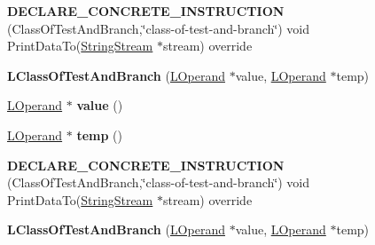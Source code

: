 \begin{DoxyCompactItemize}
\item 
{\bfseries D\+E\+C\+L\+A\+R\+E\+\_\+\+C\+O\+N\+C\+R\+E\+T\+E\+\_\+\+I\+N\+S\+T\+R\+U\+C\+T\+I\+ON} (Class\+Of\+Test\+And\+Branch,\char`\"{}class-\/of-\/test-\/and-\/branch\char`\"{}) void Print\+Data\+To(\hyperlink{classv8_1_1internal_1_1_string_stream}{String\+Stream} $\ast$stream) override\hypertarget{classv8_1_1internal_1_1_l_class_of_test_and_branch_a029c33ea762efee5c0e2f13b702a3b6f}{}\label{classv8_1_1internal_1_1_l_class_of_test_and_branch_a029c33ea762efee5c0e2f13b702a3b6f}

\item 
{\bfseries L\+Class\+Of\+Test\+And\+Branch} (\hyperlink{classv8_1_1internal_1_1_l_operand}{L\+Operand} $\ast$value, \hyperlink{classv8_1_1internal_1_1_l_operand}{L\+Operand} $\ast$temp)\hypertarget{classv8_1_1internal_1_1_l_class_of_test_and_branch_a39178393b36ba59838196357be36ab79}{}\label{classv8_1_1internal_1_1_l_class_of_test_and_branch_a39178393b36ba59838196357be36ab79}

\item 
\hyperlink{classv8_1_1internal_1_1_l_operand}{L\+Operand} $\ast$ {\bfseries value} ()\hypertarget{classv8_1_1internal_1_1_l_class_of_test_and_branch_a701d1d88a41fd46c94cc2d33ec5093b6}{}\label{classv8_1_1internal_1_1_l_class_of_test_and_branch_a701d1d88a41fd46c94cc2d33ec5093b6}

\item 
\hyperlink{classv8_1_1internal_1_1_l_operand}{L\+Operand} $\ast$ {\bfseries temp} ()\hypertarget{classv8_1_1internal_1_1_l_class_of_test_and_branch_ad6879400ca43794c61f3e6ac2829ddab}{}\label{classv8_1_1internal_1_1_l_class_of_test_and_branch_ad6879400ca43794c61f3e6ac2829ddab}

\item 
{\bfseries D\+E\+C\+L\+A\+R\+E\+\_\+\+C\+O\+N\+C\+R\+E\+T\+E\+\_\+\+I\+N\+S\+T\+R\+U\+C\+T\+I\+ON} (Class\+Of\+Test\+And\+Branch,\char`\"{}class-\/of-\/test-\/and-\/branch\char`\"{}) void Print\+Data\+To(\hyperlink{classv8_1_1internal_1_1_string_stream}{String\+Stream} $\ast$stream) override\hypertarget{classv8_1_1internal_1_1_l_class_of_test_and_branch_a029c33ea762efee5c0e2f13b702a3b6f}{}\label{classv8_1_1internal_1_1_l_class_of_test_and_branch_a029c33ea762efee5c0e2f13b702a3b6f}

\item 
{\bfseries L\+Class\+Of\+Test\+And\+Branch} (\hyperlink{classv8_1_1internal_1_1_l_operand}{L\+Operand} $\ast$value, \hyperlink{classv8_1_1internal_1_1_l_operand}{L\+Operand} $\ast$temp)\hypertarget{classv8_1_1internal_1_1_l_class_of_test_and_branch_a39178393b36ba59838196357be36ab79}{}\label{classv8_1_1internal_1_1_l_class_of_test_and_branch_a39178393b36ba59838196357be36ab79}


\end{DoxyCompactItemize}
